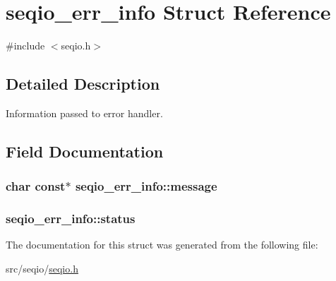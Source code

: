 \hypertarget{structseqio__err__info}{\section{seqio\-\_\-err\-\_\-info Struct Reference}
\label{structseqio__err__info}
}


{\ttfamily \#include $<$seqio.\-h$>$}



\subsection{Detailed Description}
Information passed to error handler. 

\subsection{Field Documentation}
\hypertarget{structseqio__err__info_a96f108994a26fc135dbf8a9f4996e51c}{
\subsubsection[{message}]{\setlength{\rightskip}{0pt plus 5cm}char const$\ast$ seqio\-\_\-err\-\_\-info\-::message}}\label{structseqio__err__info_a96f108994a26fc135dbf8a9f4996e51c}
\hypertarget{structseqio__err__info_a5ca24f81a5a462eb5d50842e3b29660f}{
\subsubsection[{status}]{ seqio\-\_\-err\-\_\-info\-::status}}\label{structseqio__err__info_a5ca24f81a5a462eb5d50842e3b29660f}


The documentation for this struct was generated from the following file\-:\begin{DoxyCompactItemize}
\item 
src/seqio/\hyperlink{seqio_8h}{seqio.\-h}\end{DoxyCompactItemize}

